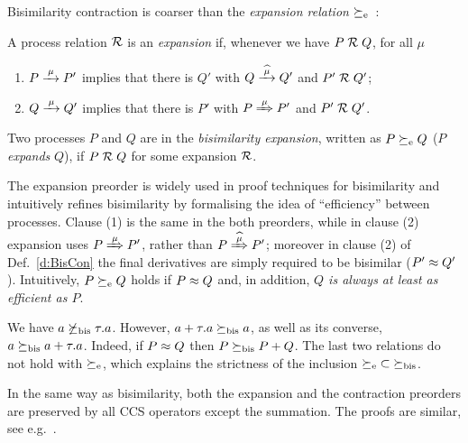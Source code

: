 Bisimilarity contraction is coarser than 
the \emph{expansion relation}
$\mathrel{\succeq_{\rm{e}}}$~\cite{arun1992efficiency,sangiorgi2015equations}:
\begin{definition}%
\label{d:expa}
A process relation ${{\cal R}}$
  is an \emph{expansion} if, whenever
we have $P\mathrel{\cal R} Q$, for all $\mu$
 \begin{enumerate}
 \item   $P \arr\mu P'$ implies that there is $Q'$ with $Q \arcap \mu  Q'$
  and $P' \mathrel{\cal R} Q'$;
 \item $Q \arr\mu Q'$   implies that there is $P'$ with $P \Arr \mu P'$ and $P' \mathrel{\cal R} Q'$.
 \end{enumerate}
Two processes $P$ and $Q$ are in the \emph{bisimilarity
  expansion}, written as $P \mathrel{\succeq_{\rm{e}}} Q$ ($P$ \emph{expands} $Q$),
 if $P \mathrel{\cal R} Q$ for some expansion ${\cal R}$.
 \end{definition}
The expansion preorder is widely used in proof techniques for bisimilarity and
intuitively refines bisimilarity by 
formalising the idea of ``efficiency'' between processes.
Clause (1) is the same in the both preorders, while in clause (2) expansion uses 
$P \Arr \mu P'$, rather than $P \Arcap \mu P'$; 
moreover in clause (2) of Def.~\ref{d:BisCon} the final derivatives
are simply required to be bisimilar ($P' \approx Q'$).
Intuitively, $P \mathrel{\succeq_{\rm{e}}} Q$ holds if $P\approx Q$ and, in addition, \emph{$Q$
  is always at least as efficient as $P$}.

\begin{example}
\label{exa:contr}
We have %
 $ a \not  \mathrel{\succeq_{\rm{bis}}} \tau. a$. However,
$a+ \tau . a \mathrel{\succeq_{\rm{bis}}} a$, as well as its converse, 
$  a \mathrel{\succeq_{\rm{bis}}} a +
\tau . a $. Indeed, if $P \approx Q$ then 
$  P  \mathrel{\succeq_{\rm{bis}}} P +Q$. The last two relations do not hold with 
$\mathrel{\succeq_{\rm{e}}}$, which explains the strictness of the inclusion
 ${\mathrel{\succeq_{\rm{e}}}} \subset {\mathrel{\succeq_{\rm{bis}}}}$. 
\end{example} 

In the same way as bisimilarity, both the expansion and the
contraction preorders are preserved by all CCS operators except the
summation. The proofs are similar, see e.g.~\cite{sangiorgi2017equations}.

